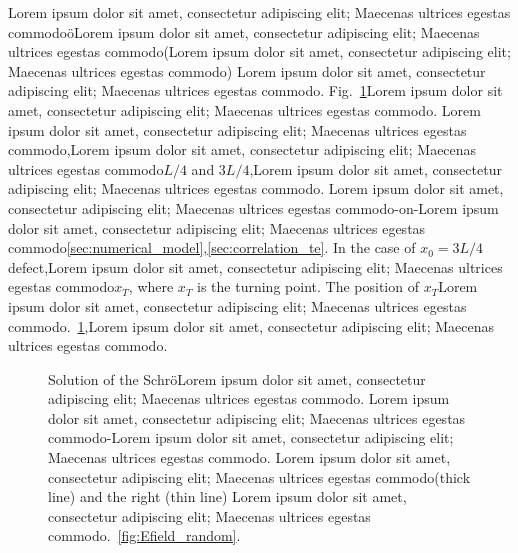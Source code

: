Lorem ipsum dolor sit amet, consectetur adipiscing elit; Maecenas ultrices egestas commodo\"{o}Lorem ipsum dolor sit amet, consectetur adipiscing elit; Maecenas ultrices egestas commodo(Lorem ipsum dolor sit amet, consectetur adipiscing elit; Maecenas ultrices egestas commodo) Lorem ipsum dolor sit amet, consectetur adipiscing elit; Maecenas ultrices egestas commodo. Fig.~\ref{fig:barrierdefectlog}Lorem ipsum dolor sit amet, consectetur adipiscing elit; Maecenas ultrices egestas commodo. Lorem ipsum dolor sit amet, consectetur adipiscing elit; Maecenas ultrices egestas commodo,Lorem ipsum dolor sit amet, consectetur adipiscing elit; Maecenas ultrices egestas commodo$L/4$ and $3L/4$,Lorem ipsum dolor sit amet, consectetur adipiscing elit; Maecenas ultrices egestas commodo. Lorem ipsum dolor sit amet, consectetur adipiscing elit; Maecenas ultrices egestas commodo-on-Lorem ipsum dolor sit amet, consectetur adipiscing elit; Maecenas ultrices egestas commodo\ref{sec:numerical_model},\ref{sec:correlation_te}. In the case of $x_0=3L/4$ defect,Lorem ipsum dolor sit amet, consectetur adipiscing elit; Maecenas ultrices egestas commodo$x_T$, where $x_T$ is the turning point. The position of $x_T$Lorem ipsum dolor sit amet, consectetur adipiscing elit; Maecenas ultrices egestas commodo.~\ref{fig:barrierdefectlog},Lorem ipsum dolor sit amet, consectetur adipiscing elit; Maecenas ultrices egestas commodo.

\begin{figure}%
\centerline{}
\caption[Solution of the Schr\"{o}Lorem ipsum dolor sit amet, consectetur adipiscing elit; Maecenas ultrices egestas commodo.]{Solution of the Schr\"{o}Lorem ipsum dolor sit amet, consectetur adipiscing elit; Maecenas ultrices egestas commodo. Lorem ipsum dolor sit amet, consectetur adipiscing elit; Maecenas ultrices egestas commodo-Lorem ipsum dolor sit amet, consectetur adipiscing elit; Maecenas ultrices egestas commodo. Lorem ipsum dolor sit amet, consectetur adipiscing elit; Maecenas ultrices egestas commodo(thick line) and the right (thin line) Lorem ipsum dolor sit amet, consectetur adipiscing elit; Maecenas ultrices egestas commodo.~\ref{fig:Efield_random}.\label{fig:barrierdefectlog}}
\end{figure}


